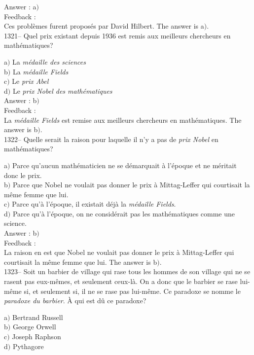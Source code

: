 \documentclass[letterpaper, 12pt]{article}
\begin{document}
Answer : a$)$\\

Feedback : \\
Ces probl\`emes furent propos\'es par David Hilbert.
The answer is  a$)$.\\

1321-- Quel prix existant depuis 1936 est remis aux meilleurs
chercheurs en math\'ematiques?

a$)$ La {\sl m\'edaille des sciences} \\
b$)$ La {\sl m\'edaille Fields} \\
c$)$ Le {\sl prix Abel} \\
d$)$ Le {\sl prix Nobel des math\'ematiques}\\

Answer : b$)$\\

Feedback : \\
La {\sl m\'edaille Fields} est remise aux meilleurs chercheurs en
math\'ematiques.
The answer is  b$)$.\\

1322-- Quelle serait la raison pour laquelle il n'y a pas de {\sl
prix Nobel} en math\'ematiques?

a$)$ Parce qu'aucun math\'ematicien ne se d\'emarquait \`a l'\'epoque et ne
m\'eritait donc le prix. \\
b$)$ Parce que Nobel ne voulait pas donner le prix \`a Mittag-Leffer qui
courtisait la m\^eme femme que lui. \\
c$)$ Parce qu'\`a l'\'epoque, il existait d\'ej\`a la {\sl m\'edaille
Fields}. \\
d$)$ Parce qu'\`a l'\'epoque, on ne consid\'erait pas les math\'ematiques
comme une science. \\

Answer : b$)$\\

Feedback : \\
La raison en est que Nobel ne voulait pas donner le prix \`a
Mittag-Leffer qui courtisait la m\^eme femme que lui.
The answer is  b$)$.\\

1323-- Soit un barbier de village qui rase tous les hommes de son
village qui ne se rasent pas eux-m\^emes, et seulement ceux-l\`a. On
a donc que le barbier se rase lui-m\^eme si, et seulement si, il ne
se rase pas lui-m\^eme. Ce paradoxe se nomme le {\sl paradoxe du
barbier}. \`A qui est d\^u ce paradoxe?

a$)$ Bertrand Russell \\
b$)$ George Orwell \\
c$)$ Joseph Raphson \\
d$)$ Pythagore\\
\end{document}
